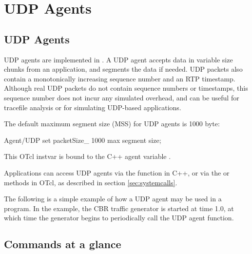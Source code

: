 \chapter{UDP Agents}
\label{sec:udpAgents}

\section{UDP Agents}
\label{sec:udpagent}
UDP agents are implemented in .  A UDP agent accepts
data in variable size chunks from an application, and segments the data 
if needed.  UDP packets also contain a monotonically increasing sequence
number and an RTP timestamp.  Although real UDP packets do not contain 
sequence numbers or timestamps, this sequence number does not incur any 
simulated overhead, and can be useful for tracefile analysis or for
simulating UDP-based applications.

The default maximum segment size (MSS) for UDP agents is 1000 byte:
\begin{program}
Agent/UDP set packetSize_   1000              \; max segment size;
\end{program}
This OTcl instvar is bound to the C++ agent variable .  

Applications can access UDP agents via the  function in C++,
or via the  or  methods in OTcl, as described in
section \ref{sec:systemcalls}.  

The following is a simple example of how a UDP agent may be used in a program.  
In the example, the CBR traffic generator is started at time 1.0, at which time
the generator begins to periodically call the UDP agent 
function.

\section{Commands at a glance}
\label{sec:udpcommand}

